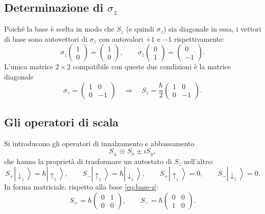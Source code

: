 \documentclass[11pt,a4paper]{article}
\newcommand{\ket}[1]{\left|#1\right\rangle}
\begin{document}
\subsection{Determinazione di \texorpdfstring{$\sigma_z$}{sigma\_z}}

Poiché la base è scelta in modo che $S_z$ (e quindi $\sigma_z$) sia diagonale in essa, i vettori di base sono autovettori di $\sigma_z$ con autovalori $+1$ e $-1$ rispettivamente:
\[
\sigma_z\begin{pmatrix}1\\0\end{pmatrix} = \begin{pmatrix}1\\0\end{pmatrix}, \qquad
\sigma_z\begin{pmatrix}0\\1\end{pmatrix} = \begin{pmatrix}0\\-1\end{pmatrix}.
\]
L'unica matrice $2\times2$ compatibile con queste due condizioni è la matrice diagonale
\begin{equation}
\sigma_z = \begin{pmatrix}1&0\\0&-1\end{pmatrix}
\quad\Longrightarrow\quad
S_z = \frac{\hbar}{2}\begin{pmatrix}1&0\\0&-1\end{pmatrix}.
\label{eq:sigma-z}
\end{equation}

\subsection{Gli operatori di scala}

Si introducono gli operatori di innalzamento e abbassamento
\begin{equation}
S_\pm \equiv S_x \pm iS_y,
\label{eq:scala-def}
\end{equation}
che hanno la proprietà di trasformare un autostato di $S_z$ nell'altro:
\[
S_+\ket{\downarrow_z} = \hbar\ket{\uparrow_z}, \qquad
S_-\ket{\uparrow_z} = \hbar\ket{\downarrow_z}, \qquad
S_+\ket{\uparrow_z}=0, \qquad S_-\ket{\downarrow_z}=0.
\]
In forma matriciale, rispetto alla base \eqref{eq:base-z}:
\begin{equation}
S_+ = \hbar\begin{pmatrix}0&1\\0&0\end{pmatrix}, \qquad
S_- = \hbar\begin{pmatrix}0&0\\1&0\end{pmatrix}.
\label{eq:scala-matrici}
\end{equation}
\end{document}
